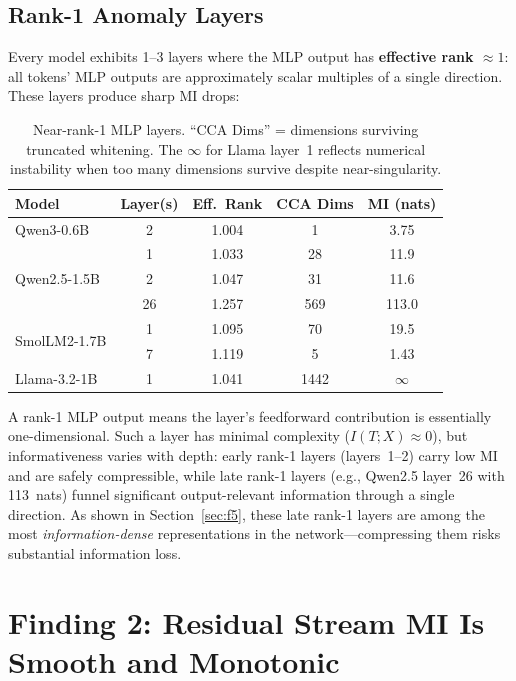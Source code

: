 \documentclass[11pt]{article}
\begin{document}
\subsection{Rank-1 Anomaly Layers}

Every model exhibits 1--3 layers where the MLP output has \textbf{effective rank $\approx 1$}: all tokens' MLP outputs are approximately scalar multiples of a single direction. These layers produce sharp MI drops:

\begin{table}[h]
\centering
\begin{tabular}{lcccc}
\toprule
\textbf{Model} & \textbf{Layer(s)} & \textbf{Eff.\ Rank} & \textbf{CCA Dims} & \textbf{MI (nats)} \\
\midrule
Qwen3-0.6B & 2 & 1.004 & 1 & 3.75 \\
\midrule
\multirow{3}{*}{Qwen2.5-1.5B} & 1 & 1.033 & 28 & 11.9 \\
 & 2 & 1.047 & 31 & 11.6 \\
 & 26 & 1.257 & 569 & 113.0 \\
\midrule
\multirow{2}{*}{SmolLM2-1.7B} & 1 & 1.095 & 70 & 19.5 \\
 & 7 & 1.119 & 5 & 1.43 \\
\midrule
Llama-3.2-1B & 1 & 1.041 & 1442 & $\infty$ \\
\bottomrule
\end{tabular}
\caption{Near-rank-1 MLP layers. ``CCA Dims'' = dimensions surviving truncated whitening. The $\infty$ for Llama layer~1 reflects numerical instability when too many dimensions survive despite near-singularity.}
\label{tab:drops}
\end{table}

A rank-1 MLP output means the layer's feedforward contribution is essentially one-dimensional. Such a layer has minimal complexity ($I(T;X) \approx 0$), but informativeness varies with depth: early rank-1 layers (layers~1--2) carry low MI and are safely compressible, while late rank-1 layers (e.g., Qwen2.5 layer~26 with 113~nats) funnel significant output-relevant information through a single direction. As shown in Section~\ref{sec:f5}, these late rank-1 layers are among the most \emph{information-dense} representations in the network---compressing them risks substantial information loss.

\section{Finding 2: Residual Stream MI Is Smooth and Monotonic}
\label{sec:f2}
\end{document}
